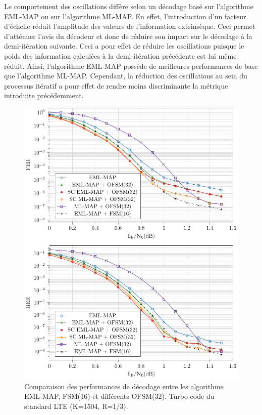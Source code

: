 Le comportement des oscillations diffère selon un décodage basé sur l'algorithme EML-MAP ou sur l'algorithme ML-MAP. En effet, 
l'introduction d'un facteur d'échelle réduit l'amplitude des valeurs de l'information extrinsèque. Ceci permet d'atténuer 
l'avis du décodeur et donc de réduire son impact sur le décodage à la demi-itération suivante. Ceci a pour effet de 
réduire les oscillations puisque le poids des information calculées à la demi-itération précédente est lui même réduit. 
Ainsi, l'algorithme EML-MAP possède de meilleures performances de base que l'algorithme ML-MAP. Cependant, la réduction 
des oscillations au sein du processus itératif a pour effet de rendre moins discriminante la métrique introduite 
précédemment. 

\begin{figure}[!h]
	\centering
	\includegraphics[width=.9\textwidth]{main/ch2_fig/tikz/redec_osc.pdf}
	\caption{\label{fig:cmp_osc}Comparaison des performances de décodage entre les algorithme EML-MAP, FSM(16) et différents OFSM(32). Turbo code du standard LTE (K=1504, R=1/3).}
\end{figure}

